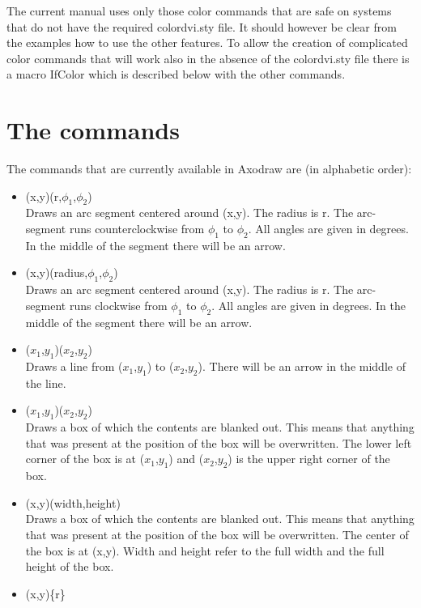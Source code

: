 The current manual uses only those color commands that are safe on systems 
that do not have the required colordvi.sty file. It should however be clear 
from the examples how to use the other features. To allow the creation of 
complicated color commands that will work also in the absence of the 
colordvi.sty file there is a macro IfColor which is described below with 
the other commands.

\section{The commands}

The commands that are currently available in Axodraw are (in alphabetic 
order):
\begin{itemize}
\item {}(x,y)(r,$\phi_1$,$\phi_2$) \hfill \\
    Draws an arc segment centered around (x,y). The radius is r. The 
    arc-segment runs counterclockwise from $\phi_1$ to $\phi_2$. All 
    angles are given in degrees. In the middle of the segment there will 
    be an arrow.
\item {}(x,y)(radius,$\phi_1$,$\phi_2$) \hfill \\
    Draws an arc segment centered around (x,y). The radius is r. The 
    arc-segment runs clockwise from $\phi_1$ to $\phi_2$. All 
    angles are given in degrees. In the middle of the segment there will 
    be an arrow.
\item {}($x_1$,$y_1$)($x_2$,$y_2$) \hfill \\
    Draws a line from ($x_1$,$y_1$) to ($x_2$,$y_2$). There will be an 
    arrow in the middle of the line.
\item {}($x_1$,$y_1$)($x_2$,$y_2$) \hfill \\
    Draws a box of which the contents are blanked out. This means that 
    anything that was present at the position of the box will be 
    overwritten. The lower left corner of the box is at ($x_1$,$y_1$) and 
    ($x_2$,$y_2$) is the upper right corner of the box.
\item {}(x,y)(width,height) \hfill \\
    Draws a box of which the contents are blanked out. This means that 
    anything that was present at the position of the box will be 
    overwritten. The center of the box is at (x,y). Width and height refer 
    to the full width and the full height of the box.
\item {}(x,y)\{r\} \hfill \\

\end{itemize}
